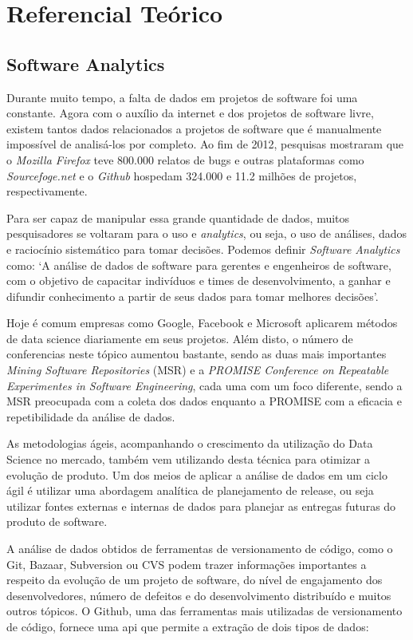 \chapter{Referencial Teórico}
\section{Software Analytics}
Durante muito tempo, a falta de dados em projetos de software foi uma constante.
Agora com o auxílio da internet e dos projetos de software livre, existem tantos
dados relacionados a projetos de software que é manualmente impossível de analisá-los
por completo\cite{artAndScience}. Ao fim de 2012, pesquisas mostraram que o \textit{Mozilla Firefox} 
teve 800.000 relatos de bugs e outras plataformas como \textit{Sourcefoge.net}
e o \textit{Github} hospedam 324.000 e 11.2 milhões de projetos, respectivamente\cite{informationNeeds}.

Para ser capaz de manipular essa grande quantidade de dados, muitos pesquisadores
se voltaram para o uso e \textit{analytics}, ou seja, o uso de análises, dados e
raciocínio sistemático para tomar decisões. Podemos definir \textit{Software Analytics}
como: `A análise de dados de software para gerentes e engenheiros de software, 
com o objetivo de capacitar indivíduos e times de desenvolvimento, a ganhar e difundir 
conhecimento a partir de seus dados para tomar melhores decisões'\cite{informationNeeds}.

Hoje é comum empresas como Google, Facebook e Microsoft aplicarem métodos de data
science diariamente em seus projetos. Além disto, o número de conferencias neste
tópico aumentou bastante, sendo as duas mais importantes \textit{Mining Software
Repositories} (MSR) e a \textit{PROMISE Conference on Repeatable Experimentes in Software
Engineering}, cada uma com um foco diferente, sendo a MSR preocupada com a coleta dos dados
enquanto a PROMISE com a eficacia e repetibilidade da análise de dados.

As metodologias ágeis, acompanhando o crescimento da utilização do Data Science no
mercado, também vem utilizando desta técnica para otimizar a evolução de produto. Um
dos meios de aplicar a análise de dados em um ciclo ágil é utilizar uma abordagem 
analítica de planejamento de release, ou seja utilizar fontes externas e internas
de dados para planejar as entregas futuras do produto de software. 

A análise de dados obtidos de ferramentas de versionamento de código, como o Git,
Bazaar, Subversion ou CVS podem trazer informações importantes a respeito da evolução
de um projeto de software, do nível de engajamento dos desenvolvedores, número de defeitos
e do desenvolvimento distribuído e muitos outros tópicos\cite{artAndScience}. O Github,
uma das ferramentas mais utilizadas de versionamento de código, fornece uma api que permite
a extração de dois tipos de dados:

